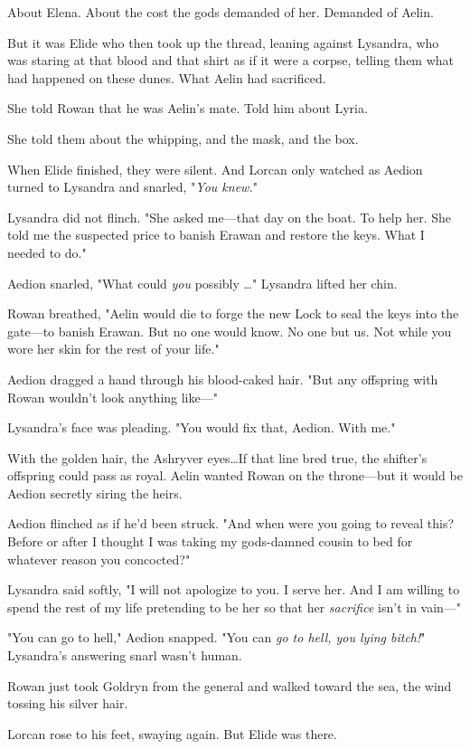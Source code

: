 About Elena.
About the cost the gods demanded of her.
Demanded of Aelin.

But it was Elide who then took up the thread, leaning against Lysandra, who was staring at that blood and that shirt as if it were a corpse, telling them what had happened on these dunes.
What Aelin had sacrificed.

She told Rowan that he was Aelin's mate.
Told him about Lyria.

She told them about the whipping, and the mask, and the box.

When Elide finished, they were silent.
And Lorcan only watched as Aedion turned to Lysandra and snarled, "\emph{You knew.}"

Lysandra did not flinch.
"She asked me---that day on the boat.
To help her.
She told me the suspected price to banish Erawan and restore the keys.
What I needed to do."

Aedion snarled, "What could \emph{you} possibly \ldots" Lysandra lifted her chin.

Rowan breathed, "Aelin would die to forge the new Lock to seal the keys into the gate---to banish Erawan.
But no one would know.
No one but us.
Not while you wore her skin for the rest of your life."

Aedion dragged a hand through his blood-caked hair.
"But any offspring with Rowan wouldn't look anything like---"

Lysandra's face was pleading.
"You would fix that, Aedion.
With me."

With the golden hair, the Ashryver eyes\ldots If that line bred true, the shifter's offspring could pass as royal.
Aelin wanted Rowan on the throne---but it would be Aedion secretly siring the heirs.

Aedion flinched as if he'd been struck.
"And when were you going to reveal this?
Before or after I thought I was taking my gods-damned cousin to bed for whatever reason you concocted?"

Lysandra said softly, "I will not apologize to you.
I serve her.
And I am willing to spend the rest of my life pretending to be her so that her \emph{sacrifice} isn't in vain---"

"You can go to hell," Aedion snapped.
"You can \emph{go to hell, you lying bitch!}" Lysandra's answering snarl wasn't human.

Rowan just took Goldryn from the general and walked toward the sea, the wind tossing his silver hair.

Lorcan rose to his feet, swaying again.
But Elide was there.

